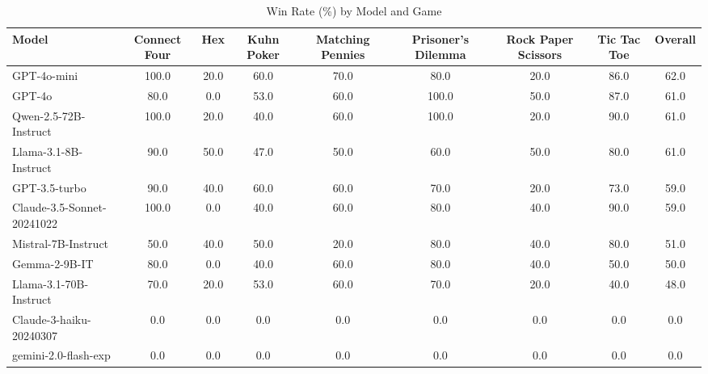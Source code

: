 \begin{table}[htbp]
\centering
\caption{Win Rate (\%) by Model and Game}
\begin{tabular}{lcccccccc}
\toprule
Model & Connect Four & Hex & Kuhn Poker & Matching Pennies & Prisoner's Dilemma & Rock Paper Scissors & Tic Tac Toe & Overall \\
\midrule
GPT-4o-mini & 100.0 & 20.0 & 60.0 & 70.0 & 80.0 & 20.0 & 86.0 & 62.0 \\
GPT-4o & 80.0 & 0.0 & 53.0 & 60.0 & 100.0 & 50.0 & 87.0 & 61.0 \\
Qwen-2.5-72B-Instruct & 100.0 & 20.0 & 40.0 & 60.0 & 100.0 & 20.0 & 90.0 & 61.0 \\
Llama-3.1-8B-Instruct & 90.0 & 50.0 & 47.0 & 50.0 & 60.0 & 50.0 & 80.0 & 61.0 \\
GPT-3.5-turbo & 90.0 & 40.0 & 60.0 & 60.0 & 70.0 & 20.0 & 73.0 & 59.0 \\
Claude-3.5-Sonnet-20241022 & 100.0 & 0.0 & 40.0 & 60.0 & 80.0 & 40.0 & 90.0 & 59.0 \\
Mistral-7B-Instruct & 50.0 & 40.0 & 50.0 & 20.0 & 80.0 & 40.0 & 80.0 & 51.0 \\
Gemma-2-9B-IT & 80.0 & 0.0 & 40.0 & 60.0 & 80.0 & 40.0 & 50.0 & 50.0 \\
Llama-3.1-70B-Instruct & 70.0 & 20.0 & 53.0 & 60.0 & 70.0 & 20.0 & 40.0 & 48.0 \\
Claude-3-haiku-20240307 & 0.0 & 0.0 & 0.0 & 0.0 & 0.0 & 0.0 & 0.0 & 0.0 \\
gemini-2.0-flash-exp & 0.0 & 0.0 & 0.0 & 0.0 & 0.0 & 0.0 & 0.0 & 0.0 \\
\bottomrule
\end{tabular}
\end{table}
